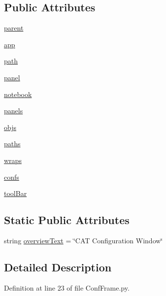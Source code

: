 \subsection*{Public Attributes}
\begin{DoxyCompactItemize}
\item 
\hyperlink{classConfFrame_1_1ConfFrame_a3f4dddac5f153d89adecc0f17e8c101d}{parent}
\item 
\hyperlink{classConfFrame_1_1ConfFrame_af1c49c5895361f1a69479b4686303ece}{app}
\item 
\hyperlink{classConfFrame_1_1ConfFrame_acf6ff455c1b319bdf5ad72c2da9fd0ff}{path}
\item 
\hyperlink{classConfFrame_1_1ConfFrame_a905bcda3bacd957ba2b30b2ce5523bc8}{panel}
\item 
\hyperlink{classConfFrame_1_1ConfFrame_a95a7738a968b728d6d71cf02cd0ce135}{notebook}
\item 
\hyperlink{classConfFrame_1_1ConfFrame_a7eb564d4c46ee0939ace2b8204e731a5}{panels}
\item 
\hyperlink{classConfFrame_1_1ConfFrame_a938607c801e07bb6b9cfbb78ce53fb92}{objs}
\item 
\hyperlink{classConfFrame_1_1ConfFrame_a595e643a3677b3933db70cd6edfae13b}{paths}
\item 
\hyperlink{classConfFrame_1_1ConfFrame_a17eb948c7eb554beca8a712f3e335e0f}{wraps}
\item 
\hyperlink{classConfFrame_1_1ConfFrame_a9975a400261ad1baff3cbf44bcc8d7b2}{confs}
\item 
\hyperlink{classConfFrame_1_1ConfFrame_adc90838e1e9a307a00ebb9ae9430a113}{toolBar}
\end{DoxyCompactItemize}
\subsection*{Static Public Attributes}
\begin{DoxyCompactItemize}
\item 
string \hyperlink{classConfFrame_1_1ConfFrame_a7612044f4be1f155ce4afaec7557ee06}{overviewText} = \char`\"{}CAT Configuration Window\char`\"{}
\end{DoxyCompactItemize}


\subsection{Detailed Description}


Definition at line 23 of file ConfFrame.py.

